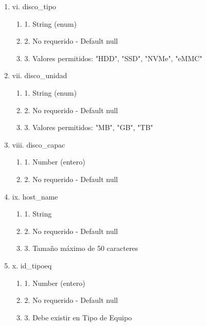 \begin{enumerate}
\begin{enumerate}
\begin{enumerate}
\begin{enumerate}
                    \end{enumerate}
                \item vi. disco\_tipo
                    \begin{enumerate}
                        \item 1. String (enum)
                        \item 2. No requerido - Default null
                        \item 3. Valores permitidos: "HDD", "SSD", "NVMe", "eMMC"
                    \end{enumerate}
                \item vii. disco\_unidad
                    \begin{enumerate}
                        \item 1. String (enum)
                        \item 2. No requerido - Default null
                        \item 3. Valores permitidos: "MB", "GB", "TB"
                    \end{enumerate}
                \item viii. disco\_capac
                    \begin{enumerate}
                        \item 1. Number (entero)
                        \item 2. No requerido - Default null
                    \end{enumerate}
                \item ix. host\_name
                    \begin{enumerate}
                        \item 1. String
                        \item 2. No requerido - Default null
                        \item 3. Tamaño máximo de 50 caracteres
                    \end{enumerate}
                \item x. id\_tipoeq
                    \begin{enumerate}
                        \item 1. Number (entero)
                        \item 2. No requerido - Default null
                        \item 3. Debe existir en Tipo de Equipo
                    \end{enumerate}

\end{enumerate}
\end{enumerate}
\end{enumerate}
